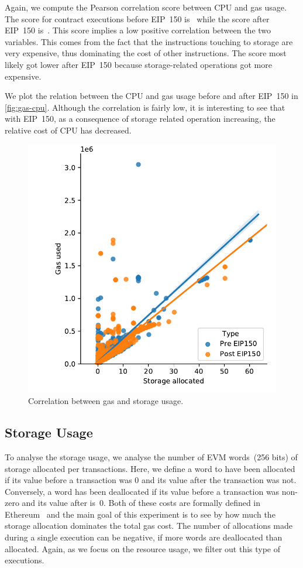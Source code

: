 Again, we compute the Pearson correlation score between CPU and gas usage. The score for contract executions before EIP~150 is~ while the score after EIP~150 is~. This score implies a low positive correlation between the two variables. This comes from the fact that the instructions touching to storage are very expensive, thus dominating the cost of other instructions. The score most likely got lower after EIP~150 because storage-related operations got more expensive.

We plot the relation between the CPU and gas usage before and after EIP~150 in \autoref{fig:gas-cpu}. Although the correlation is fairly low, it is interesting to see that with EIP~150, as a consequence of storage related operation increasing, the relative cost of CPU has decreased.

\begin{figure}[tb] \centering\includegraphics[width=.8\columnwidth]{figures/storage-usage-1400000-1500000--2500000-2600000.pdf}
	\caption{Correlation between gas and storage usage.}
	\label{fig:gas-storage}
\end{figure}

\subsection{Storage Usage}
To analyse the storage usage, we analyse the number of EVM words~(256 bits) of storage allocated per transactions. Here, we define a word to have been allocated if its value before a transaction was 0 and its value after the transaction was not. Conversely, a word has been deallocated if its value before a transaction was non-zero and its value after is~0. Both of these costs are formally defined in Ethereum~\cite{wood2014ethereum} and the main goal of this experiment is to see by how much the storage allocation dominates the total gas cost. The number of allocations made during a single execution can be negative, if more words are deallocated than allocated. Again, as we focus on the resource usage, we filter out this type of executions.

